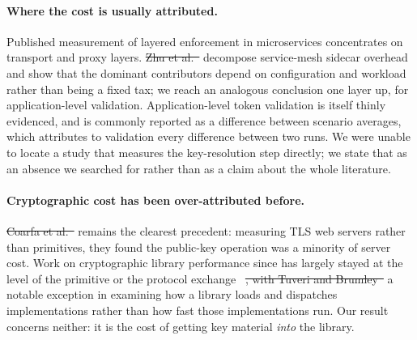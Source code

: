 \documentclass[pdflatex,sn-basic,twocolumn]{sn-jnl}%
\providecommand{\DIFadd}[1]{{\protect\color{blue}\uwave{#1}}} %
\providecommand{\DIFdel}[1]{{\protect\color{red}\sout{#1}}}                      %
\providecommand{\DIFaddbegin}{} %
\providecommand{\DIFaddend}{} %
\providecommand{\DIFdelbegin}{} %
\providecommand{\DIFdelend}{} %
\newcommand{\DIFscaledelfig}{0.5}
\newlength{\DIFdelgraphicswidth} %
\newlength{\DIFdelgraphicsheight} %
\newcommand{\DIFaddincludegraphics}[2][]{{\color{blue}\fbox{\DIFOincludegraphics[#1]{#2}}}} %
\newcommand{\DIFdelincludegraphics}[2][]{%
\sbox{\DIFdelgraphicsbox}{\DIFOincludegraphics[#1]{#2}}%
\settoboxwidth{\DIFdelgraphicswidth}{\DIFdelgraphicsbox} %
\settoboxtotalheight{\DIFdelgraphicsheight}{\DIFdelgraphicsbox} %
\scalebox{\DIFscaledelfig}{%
\parbox[b]{\DIFdelgraphicswidth}{\usebox{\DIFdelgraphicsbox}\\[-\baselineskip] \rule{\DIFdelgraphicswidth}{0em}}\llap{\resizebox{\DIFdelgraphicswidth}{\DIFdelgraphicsheight}{%
\setlength{\unitlength}{\DIFdelgraphicswidth}%
\begin{picture}(1,1)%
\thicklines\linethickness{2pt} %
{\color[rgb]{1,0,0}\put(0,0){\framebox(1,1){}}}%
{\color[rgb]{1,0,0}\put(0,0){\line( 1,1){1}}}%
{\color[rgb]{1,0,0}\put(0,1){\line(1,-1){1}}}%
\end{picture}%
}\hspace*{3pt}}} %
} %
\DeclareRobustCommand{\DIFaddbegin}{\DIFOaddbegin \let\includegraphics\DIFaddincludegraphics} %
\DeclareRobustCommand{\DIFaddend}{\DIFOaddend \let\includegraphics\DIFOincludegraphics} %
\DeclareRobustCommand{\DIFdelbegin}{\DIFOdelbegin \let\includegraphics\DIFdelincludegraphics} %
\DeclareRobustCommand{\DIFdelend}{\DIFOaddend \let\includegraphics\DIFOincludegraphics} %
\begin{document}
\paragraph{Where the cost is usually attributed.} Published measurement of
layered enforcement in microservices concentrates on transport and proxy
layers. \DIFdelbegin \DIFdel{Zhu et al.~}%
\DIFdelend \DIFaddbegin \citet{zhu2023dissecting} \DIFaddend decompose service-mesh sidecar
overhead and show that the dominant contributors depend on configuration and
workload rather than being a fixed tax; we reach an analogous conclusion one
layer up, for application-level validation. Application-level token validation
is itself thinly evidenced, and is commonly reported as a difference between
scenario averages, which attributes to validation every difference between two
runs. We were unable to locate a study that measures the key-resolution step
directly;
we state that as an absence we searched for rather than as a claim about the
whole literature.

\paragraph{Cryptographic cost has been over-attributed before.} \DIFdelbegin \DIFdel{Coarfa et
al.~}%
\DIFdelend \DIFaddbegin \citet{coarfa2006performance} \DIFaddend remains the clearest precedent: measuring TLS
web servers rather than primitives, they found the public-key operation was a
minority of server cost. Work on cryptographic library performance since has
largely stayed at the level of the primitive or the protocol
exchange~\DIFdelbegin %
\DIFdel{, with Tuveri and
Brumley~}%
\DIFdelend \DIFaddbegin \citep{naser2020performance,sikeridis2020assessing}\DIFadd{, with }\citet{tuveri2019engines} \DIFaddend a notable exception in examining how a library
loads and dispatches implementations rather than how fast those
implementations run. Our result concerns neither: it is the cost of getting key
material \emph{into} the library.
\end{document}

